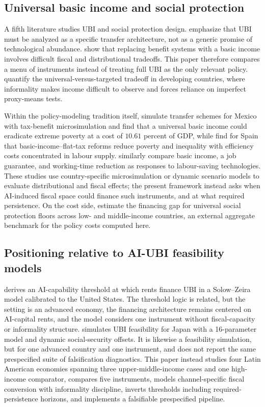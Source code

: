 \documentclass[11pt,a4paper]{article}
\begin{document}
\subsection{Universal basic income and social protection}

A fifth literature studies UBI and social protection design. \citet{gentilini2020ubi} emphasize that UBI must be analyzed as a specific transfer architecture, not as a generic promise of technological abundance. \citet{oecd2017basicincome} show that replacing benefit systems with a basic income involves difficult fiscal and distributional tradeoffs. This paper therefore compares a menu of instruments instead of treating full UBI as the only relevant policy. \citet{hanna2018universal} quantify the universal-versus-targeted tradeoff in developing countries, where informality makes income difficult to observe and forces reliance on imperfect proxy-means tests.

Within the policy-modeling tradition itself, \citet{caamal2022ubi} simulate transfer schemes for Mexico with tax-benefit microsimulation and find that a universal basic income could eradicate extreme poverty at a cost of $10.61$ percent of GDP, while \citet{lara2026basic} find for Spain that basic-income--flat-tax reforms reduce poverty and inequality with efficiency costs concentrated in labour supply. \citet{dalessandro2025exploring} similarly compare basic income, a job guarantee, and working-time reduction as responses to labour-saving technologies. These studies use country-specific microsimulation or dynamic scenario models to evaluate distributional and fiscal effects; the present framework instead asks when AI-induced fiscal space could finance such instruments, and at what required persistence. On the cost side, \citet{cattaneo2024financing} estimate the financing gap for universal social protection floors across low- and middle-income countries, an external aggregate benchmark for the policy costs computed here.

\subsection{Positioning relative to AI-UBI feasibility models}

\citet{nayebi2025threshold} derives an AI-capability threshold at which rents finance UBI in a Solow--Zeira model calibrated to the United States. The threshold logic is related, but the setting is an advanced economy, the financing architecture remains centered on AI-capital rents, and the model considers one instrument without fiscal-capacity or informality structure. \citet{ito2026ubi} simulates UBI feasibility for Japan with a 16-parameter model and dynamic social-security offsets. It is likewise a feasibility simulation, but for one advanced country and one instrument, and does not report the same prespecified suite of falsification diagnostics. This paper instead studies four Latin American economies spanning three upper-middle-income cases and one high-income comparator, compares five instruments, models channel-specific fiscal conversion with informality discipline, inverts thresholds including required-persistence horizons, and implements a falsifiable prespecified pipeline.
\end{document}
